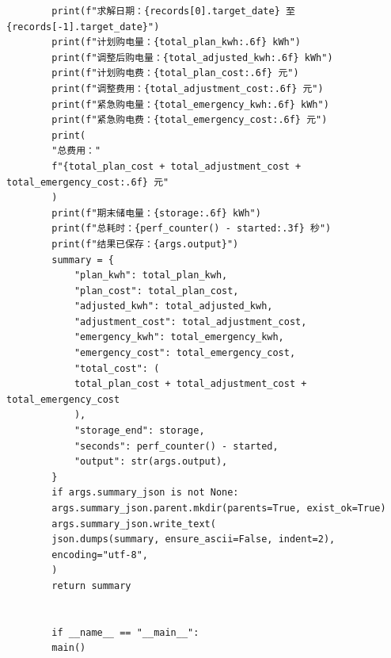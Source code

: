 \documentclass[UTF8]{ctexart}
\begin{document}
\begin{verbatim}
        print(f"求解日期：{records[0].target_date} 至 {records[-1].target_date}")
        print(f"计划购电量：{total_plan_kwh:.6f} kWh")
        print(f"调整后购电量：{total_adjusted_kwh:.6f} kWh")
        print(f"计划购电费：{total_plan_cost:.6f} 元")
        print(f"调整费用：{total_adjustment_cost:.6f} 元")
        print(f"紧急购电量：{total_emergency_kwh:.6f} kWh")
        print(f"紧急购电费：{total_emergency_cost:.6f} 元")
        print(
        "总费用："
        f"{total_plan_cost + total_adjustment_cost + total_emergency_cost:.6f} 元"
        )
        print(f"期末储电量：{storage:.6f} kWh")
        print(f"总耗时：{perf_counter() - started:.3f} 秒")
        print(f"结果已保存：{args.output}")
        summary = {
            "plan_kwh": total_plan_kwh,
            "plan_cost": total_plan_cost,
            "adjusted_kwh": total_adjusted_kwh,
            "adjustment_cost": total_adjustment_cost,
            "emergency_kwh": total_emergency_kwh,
            "emergency_cost": total_emergency_cost,
            "total_cost": (
            total_plan_cost + total_adjustment_cost + total_emergency_cost
            ),
            "storage_end": storage,
            "seconds": perf_counter() - started,
            "output": str(args.output),
        }
        if args.summary_json is not None:
        args.summary_json.parent.mkdir(parents=True, exist_ok=True)
        args.summary_json.write_text(
        json.dumps(summary, ensure_ascii=False, indent=2),
        encoding="utf-8",
        )
        return summary
        
        
        if __name__ == "__main__":
        main()
        
    \end{verbatim}
    
\end{document}
